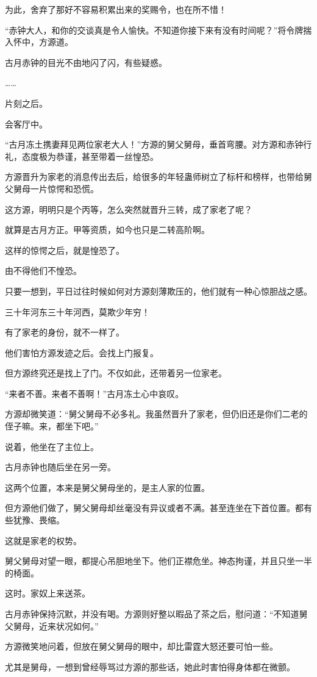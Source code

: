 \begin{this_body}
为此，舍弃了那好不容易积累出来的奖赐令，也在所不惜！

“赤钟大人，和你的交谈真是令人愉快。不知道你接下来有没有时间呢？”将令牌揣入怀中，方源道。

古月赤钟的目光不由地闪了闪，有些疑惑。

……

片刻之后。

会客厅中。

“古月冻土携妻拜见两位家老大人！”方源的舅父舅母，垂首弯腰。对方源和赤钟行礼，态度极为恭谨，甚至带着一丝惶恐。

方源晋升为家老的消息传出去后，给很多的年轻蛊师树立了标杆和榜样，也带给舅父舅母一片惊愕和恐慌。

这方源，明明只是个丙等，怎么突然就晋升三转，成了家老了呢？

就算是古月方正。甲等资质，如今也只是二转高阶啊。

这样的惊愕之后，就是惶恐了。

由不得他们不惶恐。

只要一想到，平日过往时候如何对方源刻薄欺压的，他们就有一种心惊胆战之感。

三十年河东三十年河西，莫欺少年穷！

有了家老的身份，就不一样了。

他们害怕方源发迹之后。会找上门报复。

但方源终究还是找上了门。不仅如此，还带着另一位家老。

“来者不善。来者不善啊！”古月冻土心中哀叹。

方源却微笑道：“舅父舅母不必多礼。我虽然晋升了家老，但仍旧还是你们二老的侄子嘛。来，都坐下吧。”

说着，他坐在了主位上。

古月赤钟也随后坐在另一旁。

这两个位置，本来是舅父舅母坐的，是主人家的位置。

但方源他们做了，舅父舅母却丝毫没有异议或者不满。甚至连坐在下首位置。都有些犹豫、畏缩。

这就是家老的权势。

舅父舅母对望一眼，都提心吊胆地坐下。他们正襟危坐。神态拘谨，并且只坐一半的椅面。

这时。家奴上来送茶。

古月赤钟保持沉默，并没有喝。方源则好整以暇品了茶之后，慰问道：“不知道舅父舅母，近来状况如何。”

方源微笑地问着，但放在舅父舅母的眼中，却比雷霆大怒还要可怕一些。

尤其是舅母，一想到曾经辱骂过方源的那些话，她此时害怕得身体都在微颤。


\end{this_body}
